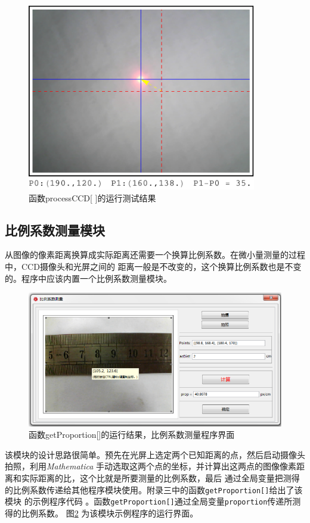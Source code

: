 \documentclass[UTF8,a4paper,12pt]{article}
\begin{document}
\begin{figure}[htbp]
\centering
\includegraphics[width=100mm]{image/processCCD-result.pdf}
\caption{函数processCCD[ ]的运行测试结果}\label{fig:processCCD-result}
\end{figure}

\subsection{比例系数测量模块}

从图像的像素距离换算成实际距离还需要一个换算比例系数。在微小量测量的过程中，CCD摄像头和光屏之间的
距离一般是不改变的，这个换算比例系数也是不变的。程序中应该内置一个比例系数测量模块。

\begin{figure}[htbp]
\centering
\includegraphics[width=130mm]{image/proportion.pdf}
\caption{函数getProportion[]的运行结果，比例系数测量程序界面}\label{fig:proportion}
\end{figure}

该模块的设计思路很简单。预先在光屏上选定两个已知距离的点，然后启动摄像头拍照，利用\textit{Mathematica}
手动选取这两个点的坐标，并计算出这两点的图像像素距离和实际距离的比，这个比就是所要测量的比例系数，最后
通过全局变量把测得的比例系数传递给其他程序模块使用。附录三中的函数\verb|getProportion[]|给出了该模块
的示例程序代码 。函数\verb|getProportion[]|通过全局变量\verb|proportion|传递所测得的比例系数。
图\;\ref{fig:proportion} 为该模块示例程序的运行界面。
\end{document}
